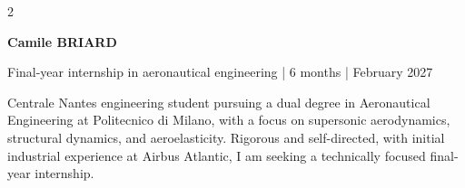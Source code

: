 \documentclass[10pt,a4paper]{article}
\begin{document}
\setlength{\columnsep}{2em}

\begin{paracol}{2}

  \RaggedRight
  {\begin{center}\huge\bfseries\color{accent}Camile BRIARD\end{center}}\par

  \begin{center}\end{center}
  \vspace{5pt}
  

  \switchcolumn

  {\large\bfseries\itshape\color{accent}\begin{center}Final-year internship in aeronautical engineering | 6 months | February 2027\end{center}}\par
  \vspace{4pt}

  {\small
  Centrale Nantes engineering student pursuing a dual degree in Aeronautical Engineering at Politecnico di Milano,
  with a focus on supersonic aerodynamics, structural dynamics, and aeroelasticity. Rigorous and self-directed,
  with initial industrial experience at Airbus Atlantic, I am seeking a technically focused final-year internship.}
  \vspace{3pt}

  
  
  

\end{paracol}
\end{document}

